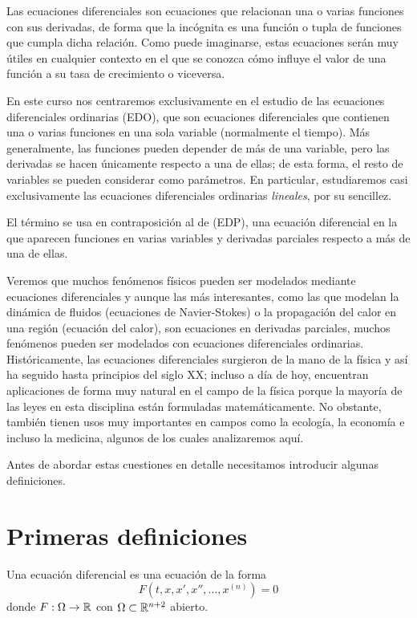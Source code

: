 \documentclass[../ecuaciones_diferenciales.tex]{subfiles}
\begin{document}
Las ecuaciones diferenciales son ecuaciones que relacionan una o varias
funciones con sus derivadas, de forma que la incógnita es una función o tupla de
funciones que cumpla dicha relación. Como puede imaginarse, estas ecuaciones
serán muy útiles en cualquier contexto en el que se conozca cómo influye el
valor de una función a su tasa de crecimiento o viceversa.

En este curso nos centraremos exclusivamente en el estudio de las ecuaciones
diferenciales ordinarias (EDO), que son ecuaciones diferenciales que contienen
una o varias funciones en una sola variable (normalmente el tiempo). Más
generalmente, las funciones pueden depender de más de una variable, pero las
derivadas se hacen únicamente respecto a una de ellas; de esta forma, el resto
de variables se pueden considerar como parámetros. En particular, estudiaremos
casi exclusivamente las ecuaciones diferenciales ordinarias \emph{lineales}, por
su sencillez.

El término  se usa en contraposición
al de  (EDP), una ecuación
diferencial en la que aparecen funciones en varias variables y derivadas
parciales respecto a más de una de ellas.

Veremos que muchos fenómenos físicos pueden ser modelados mediante ecuaciones
diferenciales y aunque las más interesantes, como las que modelan la dinámica de
fluidos (ecuaciones de Navier-Stokes) o la propagación del calor en una región
(ecuación del calor), son ecuaciones en derivadas parciales, muchos fenómenos
pueden ser modelados con ecuaciones diferenciales ordinarias. Históricamente,
las ecuaciones diferenciales surgieron de la mano de la física y así ha seguido
hasta principios del siglo XX; incluso a día de hoy, encuentran aplicaciones de
forma muy natural en el campo de la física porque la mayoría de las leyes en
esta disciplina están formuladas matemáticamente. No obstante, también tienen
usos muy importantes en campos como la ecología, la economía e incluso la
medicina, algunos de los cuales analizaremos aquí.

Antes de abordar estas cuestiones en detalle necesitamos introducir algunas
definiciones.

\section{Primeras definiciones}

\begin{definition}
	Una ecuación diferencial es una ecuación de la forma
	\[F(t, x, x', x'', \dots, x^{(n)}) = 0\]
	donde \(F : \Omega \to \mathbb{R}\) con \(\Omega \subset \mathbb{R}^{n + 2}\) abierto.
\end{definition}
\end{document}
